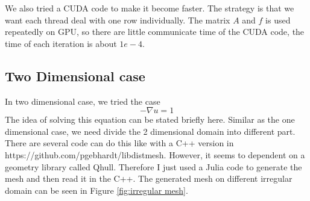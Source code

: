 \documentclass[11pt]{article}
\begin{document}
We also tried a CUDA code to make it become faster. The strategy is that we want each thread deal with one row individually. The matrix $A$ and $f$ is used repeatedly on GPU, so there are little communicate time of the CUDA code, the time of each iteration is about $1e-4$.


\subsection{Two Dimensional case}

In two dimensional case, we tried the case
\begin{equation}
    -\nabla u = 1 
\end{equation}
The idea of solving this equation can be stated briefly here.
Similar as the one dimensional case, we need divide the 2 dimensional domain into different part. There are several code can do this like \cite{persson2004simple} with a C++ version in https://github.com/pgebhardt/libdistmesh. However, it seems to dependent on a geometry library called Qhull. Therefore I just used a Julia code to generate the mesh and then read it in the C++. The generated mesh on different irregular domain can be seen in Figure \ref{fig:irregular mesh}.
\end{document}
